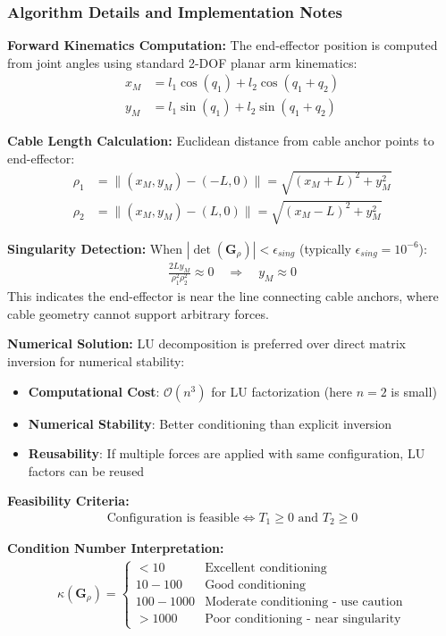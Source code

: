 \subsubsection{Algorithm Details and Implementation Notes}

\textbf{Forward Kinematics Computation:}
The end-effector position is computed from joint angles using standard 2-DOF planar arm kinematics:
\begin{align}
x_M &= l_1 \cos(q_1) + l_2 \cos(q_1 + q_2) \\
y_M &= l_1 \sin(q_1) + l_2 \sin(q_1 + q_2)
\end{align}

\textbf{Cable Length Calculation:}
Euclidean distance from cable anchor points to end-effector:
\begin{align}
\rho_1 &= \|(x_M, y_M) - (-L, 0)\| = \sqrt{(x_M + L)^2 + y_M^2} \\
\rho_2 &= \|(x_M, y_M) - (L, 0)\| = \sqrt{(x_M - L)^2 + y_M^2}
\end{align}

\textbf{Singularity Detection:}
When $|\det(\bm{G}_{\rho})| < \epsilon_{sing}$ (typically $\epsilon_{sing} = 10^{-6}$):
\begin{align}
\frac{2L y_M}{\rho_1^2 \rho_2^2} \approx 0 \quad \Rightarrow \quad y_M \approx 0
\end{align}
This indicates the end-effector is near the line connecting cable anchors, where cable geometry cannot support arbitrary forces.

\textbf{Numerical Solution:}
LU decomposition is preferred over direct matrix inversion for numerical stability:
\begin{itemize}
    \item \textbf{Computational Cost}: $\mathcal{O}(n^3)$ for LU factorization (here $n=2$ is small)
    \item \textbf{Numerical Stability}: Better conditioning than explicit inversion
    \item \textbf{Reusability}: If multiple forces are applied with same configuration, LU factors can be reused
\end{itemize}

\textbf{Feasibility Criteria:}
\begin{align}
\text{Configuration is feasible} \iff T_1 \geq 0 \text{ and } T_2 \geq 0
\end{align}

\textbf{Condition Number Interpretation:}
\begin{align}
\kappa(\bm{G}_{\rho}) = \begin{cases}
< 10 & \text{Excellent conditioning} \\
10 - 100 & \text{Good conditioning} \\
100 - 1000 & \text{Moderate conditioning - use caution} \\
> 1000 & \text{Poor conditioning - near singularity}
\end{cases}
\end{align}

